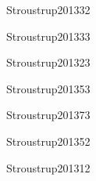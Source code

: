 \begin{syllabus}
\begin{unit}{\ALBasicAnalysisDef}{Stroustrup2013}{3}{2}
   \begin{topics}
      \item \ALBasicAnalysisTopicAsymptotic
      \item \ALBasicAnalysisTopicIdentifying
   \end{topics}
   \begin{unitgoals}
      \item \ALBasicAnalysisObjTHREE
   \end{unitgoals}
\end{unit}

\begin{unit}{\ALFundamentalAlgorithmsDef}{Stroustrup2013}{3}{3}
    \ALFundamentalAlgorithmsAllTopics
    \ALFundamentalAlgorithmsAllObjectives
\end{unit}

\begin{unit}{\PLDeclarationsAndTypesDef}{Stroustrup2013}{2}{3}
    \PLDeclarationsAndTypesAllTopics
    \PLDeclarationsAndTypesAllObjectives
\end{unit}

\begin{unit}{\PLAbstractionMechanismsDef}{Stroustrup2013}{5}{3}
    \PLAbstractionMechanismsAllTopics
    \PLAbstractionMechanismsAllTopics
\end{unit}

\begin{unit}{\PLObjectOrientedProgrammingDef}{Stroustrup2013}{7}{3}
    \PLObjectOrientedProgrammingAllTopics
    \PLObjectOrientedProgrammingAllObjectives
\end{unit}

\begin{unit}{\SESoftwareDesignDef}{Stroustrup2013}{5}{2}
   \begin{topics}
	\item \SESoftwareDesignTopicFundamental%
	\item \SESoftwareDesignTopicTherole%
	\item \SESoftwareDesignTopicDesignPatterns%
   \end{topics}
   \begin{unitgoals}
      \item \SESoftwareDesignObjONE
      \item \SESoftwareDesignObjFIVE
   \end{unitgoals}
\end{unit}

\begin{unit}{\SEUsingAPIsDef}{Stroustrup2013}{1}{2}
   \SEUsingAPIsAllTopics
   \SEUsingAPIsAllObjectives
\end{unit}


\end{syllabus}
